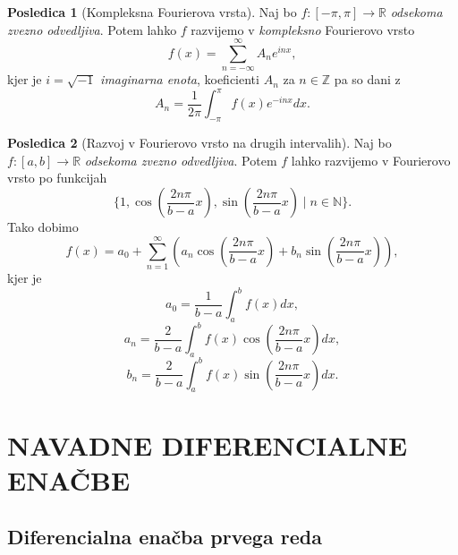 \documentclass[11pt]{article}
\theoremstyle{definition}
\theoremstyle{definition}
\theoremstyle{definition}
\theoremstyle{theorem}
\newtheorem*{posledica}{Posledica}
\begin{document}
\begin{posledica}[Kompleksna Fourierova vrsta]

Naj bo $f:[-\pi, \pi] \rightarrow \mathbb{R}$ \textit{odsekoma zvezno odvedljiva}. Potem lahko $f$ razvijemo v \textit{kompleksno} Fourierovo vrsto
$$f(x) = \sum_{n=-\infty}^{\infty} A_n e^{inx},$$
kjer je $i = \sqrt{-1}$ \textit{imaginarna enota}, koeficienti $A_n$ za $n \in \mathbb{Z}$ pa so dani z
$$A_n = \frac{1}{2\pi} \int_{-\pi}^{\pi} f(x) e^{-inx} dx.$$

\end{posledica}
\vspace{0.5cm}

\begin{posledica}[Razvoj v Fourierovo vrsto na drugih intervalih]

Naj bo $f:[a, b] \rightarrow \mathbb{R}$ \textit{odsekoma zvezno odvedljiva}. Potem $f$ lahko razvijemo v Fourierovo vrsto po funkcijah
$$\{ 1, \cos(\frac{2n\pi}{b-a}x), \sin(\frac{2n\pi}{b-a}x) \mid n \in \mathbb{N} \}.$$
Tako dobimo
$$f(x) = a_0 + \sum_{n=1}^{\infty} \left( a_n \cos(\frac{2n\pi}{b-a}x) + b_n \sin(\frac{2n\pi}{b-a}x) \right),$$
kjer je 
$$a_0 = \frac{1}{b-a} \int_{a}^{b} f(x) dx,$$
$$a_n = \frac{2}{b-a} \int_{a}^{b} f(x) \cos(\frac{2n\pi}{b-a}x) dx,$$
$$b_n = \frac{2}{b-a} \int_{a}^{b} f(x) \sin(\frac{2n\pi}{b-a}x) dx.$$

\end{posledica}
\vspace{0.5cm}


\pagebreak


\section{NAVADNE DIFERENCIALNE ENAČBE}
\vspace{0.5cm}


\subsection{Diferencialna enačba prvega reda}
\vspace{0.5cm}
\end{document}
